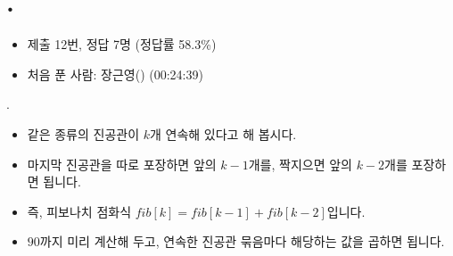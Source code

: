 
\section{\texorpdfstring{\pletter. \ptitle}{문제 \pletter}}

\begin{frame}[label=problem-I]
    \sectiontitle{\pletter}{\ptitle}
    \begin{itemize}
        \item 제출 12번, 정답 7명 (정답률 58.3\%)
        \item 처음 푼 사람: 장근영() (00:24:39)
    \end{itemize}
\end{frame}

\begin{frame}{\textbf{\pletter}. \ptitle}
\begin{itemize}
    \item 같은 종류의 진공관이 $k$개 연속해 있다고 해 봅시다.
    \item 마지막 진공관을 따로 포장하면 앞의 $k-1$개를, 짝지으면 앞의 $k-2$개를 포장하면 됩니다.
    \item 즉, 피보나치 점화식 $fib[k]=fib[k-1]+fib[k-2]$입니다.
    \item $90$까지 미리 계산해 두고, 연속한 진공관 묶음마다 해당하는 값을 곱하면 됩니다.
\end{itemize}
\end{frame}

